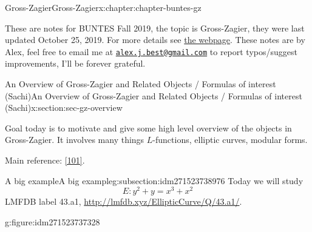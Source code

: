 \documentclass[oneside,10pt,]{book}
\numberwithin{equation}{section}
\begin{document}
\begin{chapterptx}{Gross-Zagier}{}{Gross-Zagier}{}{}{x:chapter:chapter-buntes-gz}
\begin{introduction}{}%
These are notes for BUNTES Fall 2019, the topic is Gross-Zagier, they were last updated October 25, 2019. For more details see \href{http://math.bu.edu/people/svh/GrossZagier.html}{the webpage}. These notes are by Alex, feel free to email me at \href{mailto:alex.j.best@gmail.com}{\nolinkurl{alex.j.best@gmail.com}} to report typos\slash{}suggest improvements, I'll be forever grateful.%
\end{introduction}%
%
%
\typeout{************************************************}
\typeout{************************************************}
%
\begin{sectionptx}{An Overview of Gross-Zagier and Related Objects \slash{} Formulas of interest (Sachi)}{}{An Overview of Gross-Zagier and Related Objects \slash{} Formulas of interest (Sachi)}{}{}{x:section:sec-gz-overview}
\begin{introduction}{}%
Goal today is to motivate and give some high level overview of the objects in Gross-Zagier. It involves many things \(L\)-functions, elliptic curves, modular forms.%
\par
Main reference: \hyperlink{x:biblio:bib-zagier-modular}{[101]}.%
\end{introduction}%
%
%
\typeout{************************************************}
\typeout{************************************************}
%
\begin{subsectionptx}{A big example}{}{A big example}{}{}{g:subsection:idm271523738976}
Today we will study%
\begin{equation*}
E\colon y^2 + y=  x^3 + x^2
\end{equation*}
LMFDB label 43.a1, \url{http://lmfdb.xyz/EllipticCurve/Q/43.a1/}.%
\begin{figureptx}{}{g:figure:idm271523737328}{}%
\begin{image}{0}{1}{0}%
\end{image}
\end{figureptx}
\end{subsectionptx}
\end{sectionptx}
\end{chapterptx}
\end{document}
